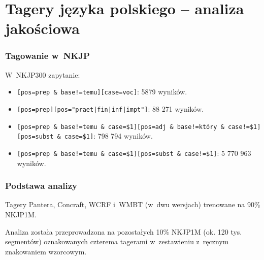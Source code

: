 \documentclass[xcolor=dvipsnames,polish]{beamer}
\begin{document}
\section{Tagery języka polskiego -- analiza jakościowa}
\frame{\sectionpage}


\begin{frame}
  \frametitle{Tagowanie w~NKJP}
W~NKJP300 zapytanie:
\begin{itemize}\small

\item<2-> \texttt{[pos=prep \& base!=temu][case=voc]}:
  5879 wyników.

\medskip

\item<3-> \texttt{[pos=prep][pos="praet|fin|inf|impt"]}: 88
271 wyników.

\medskip

\item<4-> \texttt{[pos=prep \& base!=temu \& case=\$1][pos=adj \&
    base!=który \& case!=\$1][pos=subst \& case=\$1]}: 798 794 wyników.

\medskip

\item<5-> \texttt{[pos=prep \& base!=temu \& case=\$1][pos=subst \&
    case!=\$1]}: 5 770 963 wyników.
\end{itemize}
\end{frame}

\begin{frame}
  \frametitle{Podstawa analizy}

Tagery Pantera, Concraft, WCRF i~WMBT (w~dwu wersjach)  trenowane na 90\% NKJP1M. \\

\medskip

Analiza została przeprowadzona na pozostałych 10\%  NKJP1M (ok. 120
tys. segmentów) oznakowanych
czterema tagerami w~zestawieniu z~ręcznym znakowaniem wzorcowym.



\end{frame}
\end{document}
